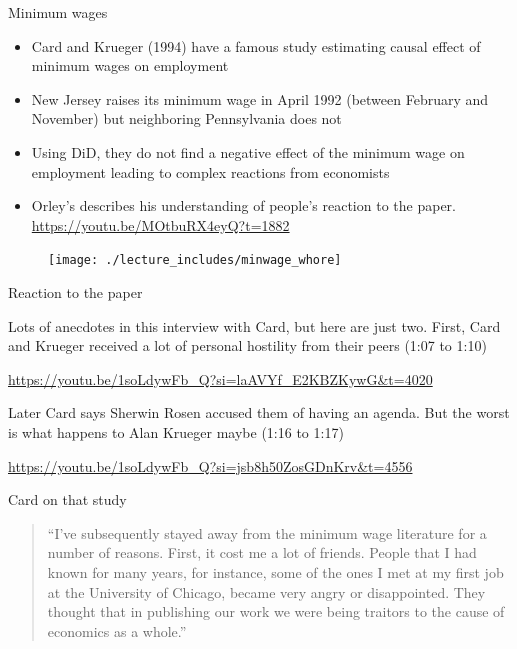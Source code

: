 \documentclass{beamer}
\begin{document}
\begin{frame}{Minimum wages}

\begin{itemize}
\item Card and Krueger (1994) have a famous study estimating causal effect of minimum wages on employment
\item  New Jersey raises its minimum wage in April 1992 (between February and November) but neighboring Pennsylvania does not
\item Using DiD, they do not find a negative effect of the minimum wage on employment leading to complex reactions from economists
\item Orley's describes his understanding of people's reaction to the paper.  \\ \url{https://youtu.be/MOtbuRX4eyQ?t=1882}
\end{itemize}

\end{frame}

\begin{frame}
	\begin{figure}
	\texttt{[image: ./lecture\_includes/minwage\_whore]}
	\end{figure}
\end{frame}


\begin{frame}{Reaction to the paper}


Lots of anecdotes in this interview with Card, but here are just two.  First, Card and Krueger received a lot of personal hostility from their peers (1:07 to 1:10)

\bigskip

\url{https://youtu.be/1soLdywFb_Q?si=laAVYf_E2KBZKywG&t=4020}

\bigskip

Later Card says Sherwin Rosen accused them of having an agenda.  But the worst is what happens to Alan Krueger maybe (1:16 to 1:17)

\bigskip

\url{https://youtu.be/1soLdywFb_Q?si=jsb8h50ZosGDnKrv&t=4556}




\end{frame}

\begin{frame}{Card on that study}

\begin{quote}
``I’ve subsequently stayed away from the minimum wage literature for a number of reasons. First, it cost me a lot of friends. People that I had known for many years, for instance, some of the ones I met at my first job at the University of Chicago, became very angry or disappointed. They thought that in publishing our work we were being traitors to the cause of economics as a whole.''
\end{quote}


\end{frame}
\end{document}

